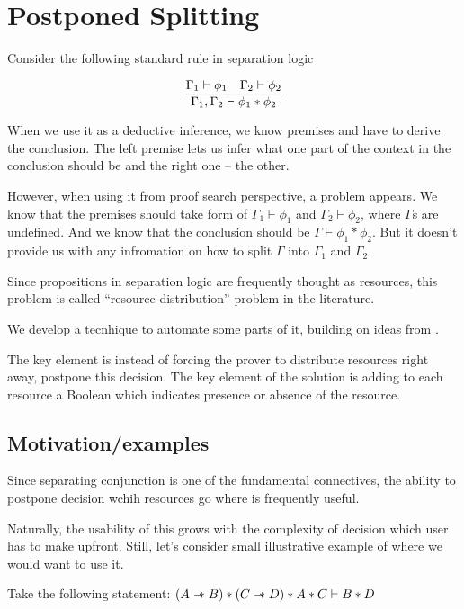 \chapter{Postponed Splitting}
\label{chap:postponed_splitting}

Consider the following standard rule in separation logic

\[\infer{\Gamma_1, \Gamma_2 \vdash \phi_1 \ast \phi_2}
        {\Gamma_1 \vdash \phi_1 &
         \Gamma_2 \vdash \phi_2} \]

When we use it as a deductive inference, we know premises and have to derive the conclusion.
The left premise lets us infer what one part of the context in the conclusion should be and the right one -- the other.

However, when using it from proof search perspective, a problem appears.
We know that the premises should take form of \(\Gamma_1 \vdash \phi_1\) and \(\Gamma_2 \vdash \phi_2\), where $\Gamma$s are undefined.
And we know that the conclusion should be \(\Gamma \vdash \phi_1 \ast \phi_2\).
But it doesn't provide us with any infromation on how to split \(\Gamma\) into \(\Gamma_1\) and \(\Gamma_2\).

Since propositions in separation logic are frequently thought as resources, this problem is called ``resource distribution'' problem in the literature.

We develop a tecnhique to automate some parts of it, building on ideas from \citet{harlandResourceDistributionBooleanConstraints2003}.

The key element is instead of forcing the prover to distribute resources right away, postpone this decision.
The key element of the solution is adding to each resource a Boolean  which indicates presence or absence of the resource.

\section{Motivation/examples}

Since separating conjunction is one of the fundamental connectives, the ability to postpone decision wchih resources go where is frequently useful.

Naturally, the usability of this grows with the complexity of decision which user has to make upfront.
Still, let's consider small illustrative example of where we would want to use it.

Take the following statement:
\((A \mathrel{-\mkern-6mu*} B) * (C \mathrel{-\mkern-6mu*} D) * A * C \vdash B * D\)

